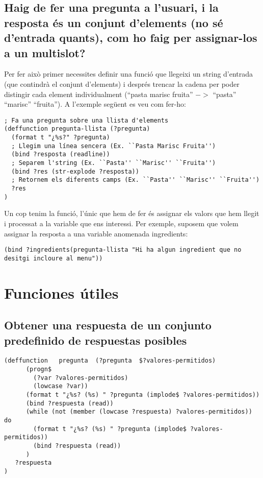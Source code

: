 \documentclass[11pt,svgnames]{scrbook}
\begin{document}
\subsection{Haig de fer una pregunta a l'usuari, i la resposta és un conjunt d'elements (no sé d'entrada quants), com ho faig per assignar-los a un multislot?}

Per fer això primer necessites definir una funció que llegeixi un string d'entrada (que contindrà el conjunt d'elements) i després trencar la cadena per poder distingir cada element individualment (``pasta marisc fruita'' $->$ ``pasta'' ``marisc'' ``fruita''). A l'exemple següent es veu com fer-ho:

\begin{verbatim}
; Fa una pregunta sobre una llista d'elements
(deffunction pregunta-llista (?pregunta) 
  (format t "¿%s?" ?pregunta)
  ; Llegim una línea sencera (Ex. ``Pasta Marisc Fruita'')
  (bind ?resposta (readline)) 
  ; Separem l'string (Ex. ``Pasta'' ``Marisc'' ``Fruita'')
  (bind ?res (str-explode ?resposta)) 
  ; Retornem els diferents camps (Ex. ``Pasta'' ``Marisc'' ``Fruita'')
  ?res
) \end{verbatim}


Un cop tenim la funció, l'únic que hem de fer és assignar els valors que hem llegit i processat a la variable que ens interessi. Per exemple, suposem que volem assignar la resposta a una variable anomenada ingredients:
\medskip

\noindent \texttt{(bind ?ingredients\break (pregunta-llista "Hi ha algun ingredient que no desitgi
incloure al menu"))
}





\section{Funciones útiles}


\subsection{Obtener una respuesta de un conjunto predefinido de respuestas posibles}

\begin{verbatim}
(deffunction   pregunta  (?pregunta  $?valores-permitidos)
      (progn$
        (?var ?valores-permitidos)
        (lowcase ?var))
      (format t "¿%s? (%s) " ?pregunta (implode$ ?valores-permitidos))
      (bind ?respuesta (read))
      (while (not (member (lowcase ?respuesta) ?valores-permitidos)) do
        (format t "¿%s? (%s) " ?pregunta (implode$ ?valores-permitidos))
        (bind ?respuesta (read))
      )
   ?respuesta
)
\end{verbatim}
\end{document}

